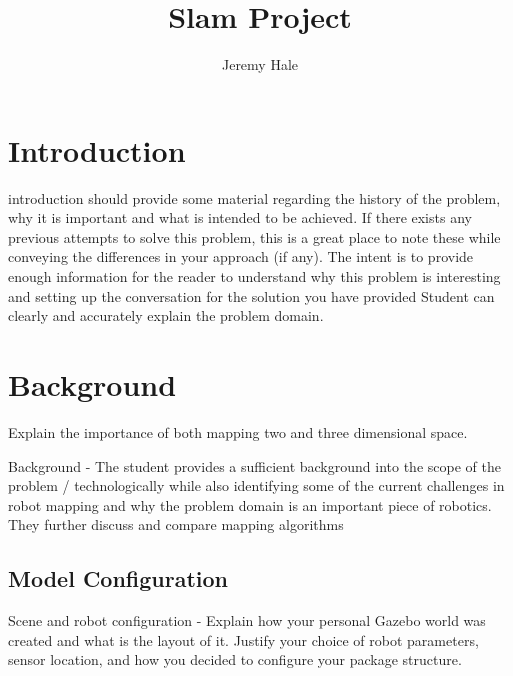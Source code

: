\documentclass[10pt,journal,compsoc]{IEEEtran}
\begin{document}
\title{Slam Project}

\author{Jeremy Hale}

%
{}


\maketitle
\IEEEdisplaynontitleabstractindextext
\IEEEpeerreviewmaketitle
\section{Introduction}
\label{sec:introduction}

 introduction should provide some material regarding the history of the problem, why it is important and what is intended to be achieved. If there exists any previous attempts to solve this problem, this is a great place to note these while conveying the differences in your approach (if any). The intent is to provide enough information for the reader to understand why this problem is interesting and setting up the conversation for the solution you have provided
Student can clearly and accurately explain the problem domain.

\section{Background}
Explain the importance of both mapping two and three dimensional space.

Background - The student provides a sufficient background into the scope of the problem / technologically while also identifying some of the current challenges in robot mapping and why the problem domain is an important piece of robotics. They further discuss and compare mapping algorithms

\subsection{Model Configuration}
Scene and robot configuration - Explain how your personal Gazebo world was created and what is the layout of it. Justify your choice of robot parameters, sensor location, and how you decided to configure your package structure.
\end{document}
